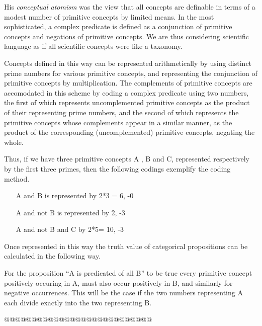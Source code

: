 His \emph{conceptual atomism} was the view that all concepts are definable in terms
of a modest number of primitive concepts by limited means.
In the most sophisticated, a complex predicate is defined as a conjunction of primitive
concepts and negations of primitive concepts.
We are thus considering scientific language as if all scientific concepts were like a taxonomy.

Concepts defined in this way can be represented arithmetically by using distinct prime numbers for
various primitive concepts, and representing the conjunction of primitive concepts by multiplication.
The complements of primitive concepts are accomodated in this scheme by coding a complex predicate
using two numbers, the first of which represents uncomplemented primitive concepts as the product of
their representing prime numbers, and the second of which represents the primitive concepts whose
complements appear in a similar manner, as the product of the corresponding (uncomplemented) primitive
concepts, negating the whole.

Thus, if we have three primitive concepts A , B and C, represented respectively by
the first three primes, then the following codings exemplify  the coding method.

\begin{itemize}
\item[A and B] is represented by 2*3 = 6, -0
\item[A and not B] is represented by 2, -3
\item[A and not B and C] by 2*5= 10, -3
\end{itemize}

Once represented in this way the truth value of categorical
propositions can be calculated in the following way.

For the proposition ``A is predicated of all B'' to be true every primitive concept
positively occuring in A, must also occur positively in B, and similarly for negative
occurrences.
This will be the case if the two numbers representing A each divide exactly into the two
representing B.


@@@@@@@@@@@@@@@@@@@@@@@@@@@

 

